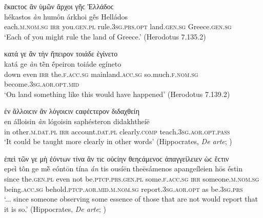 \begin{exe}
\ex ἕκαϲτοϲ ἂν ὑμῶν ἄρχοι γῆϲ Ἑλλάδοϲ\\
\gll hékastos \emph{àn} humôn árkhoi gês Helládos\\
each.\textsc{m.nom.sg} \textsc{irr} you.\textsc{gen.pl} rule.\textsc{3sg.prs.opt} land.\textsc{gen.sg} Greece.\textsc{gen.sg}\\
\trans `Each of you might rule the land of Greece.' (Herodotus 7.135.2)
\label{wordgroup13}
\end{exe}

\begin{exe}
\ex κατά γε ἂν τὴν ἤπειρον τοιάδε ἐγίνετο\\
\gll katá ge \emph{àn} tḕn ḗpeiron toiáde egíneto\\
down even \textsc{irr} the.\textsc{f.acc.sg} mainland.\textsc{acc.sg} so.much.\textsc{f.nom.sg} become.\textsc{3sg.aor.opt.mid}\\
\trans `On land something like this would have happened' (Herodotus 7.139.2)
\label{wordgroup14}
\end{exe}

\begin{exe}
\ex ἐν ἄλλοιϲιν ἂν λόγοιϲιν ϲαφέϲτερον διδαχθείη\\
\gll en álloisin \emph{àn} lógoisin saphésteron didakhtheíē\\
in other.\textsc{m.dat.pl} \textsc{irr} account.\textsc{dat.pl} clearly.\textsc{comp} teach.\textsc{3sg.aor.opt.pass}\\
\trans `It could be taught more clearly in other words' (Hippocrates, \textit{De arte}; \citealp[44, line 8]{Gomperz1890})
\label{wordgroup15}
\end{exe}

\begin{exe}
\ex ἐπεὶ τῶν γε μὴ ἐόντων τίνα ἄν τιϲ οὐϲίην θεηϲάμενοϲ ἀπαγγείλειεν ὡϲ ἔϲτιν\\
\gll epeì tôn ge mḕ eóntōn tína \emph{án} tis ousíēn theēsámenos apangeíleien hōs éstin\\
since the.\textsc{gen.pl} even not be.\textsc{ptcp.prs.gen.pl} some.\textsc{f.acc.sg} \textsc{irr} someone.\textsc{m.nom.sg} being.\textsc{acc.sg} behold.\textsc{ptcp.aor.mid.m.nom.sg} report.\textsc{3sg.aor.opt} as be.\textsc{3sg.prs}\\
\trans `... since someone observing some essence of those that are not would report that it is so.' (Hippocrates, \textit{De arte}; \citealp[42, line 19]{Gomperz1890})
\label{wordgroup16}
\end{exe}

